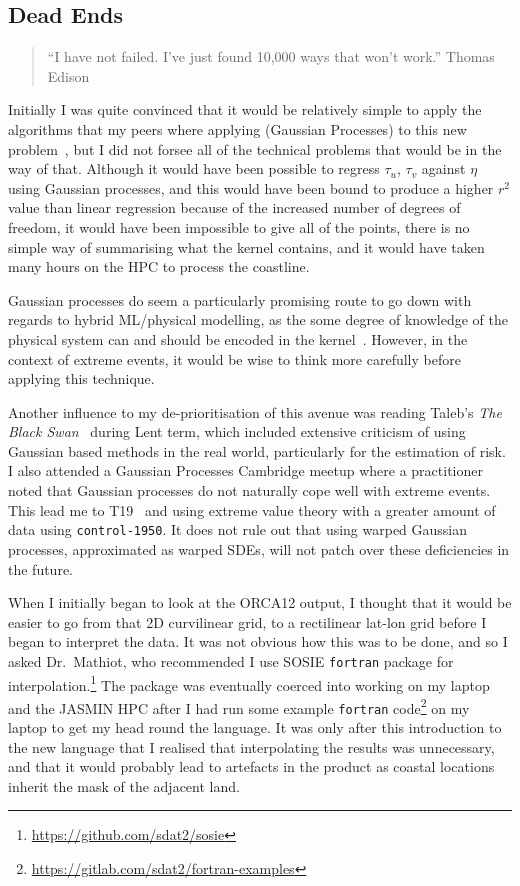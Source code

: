 
\subsection{Dead Ends}

\begin{quote}
``I have not failed. I've just found 10,000 ways that won't work.''
Thomas Edison
\end{quote}

Initially I was quite convinced that it would be relatively
simple to apply the algorithms that my peers where applying
(Gaussian Processes) to this new problem~\cite{LeMaitre2019gaussian}, but I did not
forsee all of the technical problems that would be in the way of that.
Although it would have been possible to regress $\tau_u$, $\tau_v$ against
$\eta$ using Gaussian processes, and this would have been bound to produce a
higher $r^2$ value than linear regression because of the increased number of
degrees of freedom, it would have been impossible to give all of the points,
there is no simple way of summarising what the kernel contains,
and it would have taken many hours on the HPC to process the coastline.

Gaussian processes do seem a particularly promising route to go down
with regards to hybrid ML/physical modelling, as the some degree of knowledge
of the physical system can and should be encoded in the kernel~\cite{duvenaud2014automatic}.
However, in the context of extreme events, it would be wise to think more carefully
before applying this technique.

Another influence to  my de-prioritisation of this
avenue was reading Taleb's \textit{The Black Swan}~\cite{taleb2007black} during Lent
term, which included extensive criticism of using Gaussian based methods in the
real world, particularly for the estimation of risk.
I also attended a Gaussian Processes Cambridge meetup where a practitioner noted that
Gaussian processes do not naturally cope well with extreme
events. This lead me to T19~\cite{taleb2019statistical} and using extreme value
theory with a greater amount of data using \texttt{control-1950}.
It does not rule out that using warped Gaussian processes, approximated as
warped SDEs, will not patch over these deficiencies in the future.

When I initially began to look at the ORCA12 output,
I thought that it would be easier to go from that 2D
curvilinear grid, to a rectilinear lat-lon grid before
I began to interpret the data. It was not obvious how
this was to be done, and so I asked Dr.~Mathiot, who recommended
I use SOSIE \texttt{fortran} package for interpolation.\footnote{\url{https://github.com/sdat2/sosie}}
The package was eventually coerced into working on my laptop and the JASMIN
HPC after I had run some example \texttt{fortran}
code\footnote{\url{https://gitlab.com/sdat2/fortran-examples}} on my laptop
to get my head round the language. It was only after this introduction to
the new language that I realised that interpolating the results was
unnecessary, and that it would probably lead to artefacts in the product as coastal
locations inherit the mask of the adjacent land.

